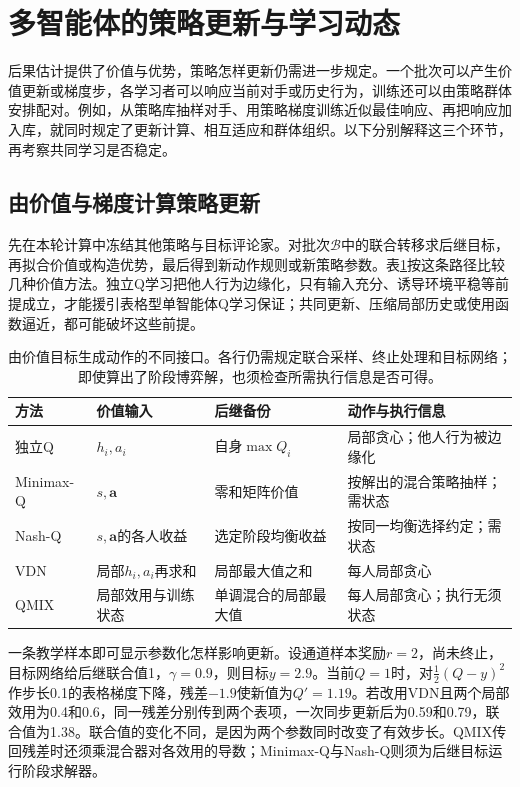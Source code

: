\section{多智能体的策略更新与学习动态}
\label{sec:rl-multi-agent-learning}

后果估计提供了价值与优势，策略怎样更新仍需进一步规定。一个批次可以产生价值更新或梯度步，各学习者可以响应当前对手或历史行为，训练还可以由策略群体安排配对。例如，从策略库抽样对手、用策略梯度训练近似最佳响应、再把响应加入库，就同时规定了更新计算、相互适应和群体组织。以下分别解释这三个环节，再考察共同学习是否稳定。

\subsection{由价值与梯度计算策略更新}
\label{sec:rl-multi-agent-update}

先在本轮计算中冻结其他策略与目标评论家。对批次$\mathcal B$中的联合转移求后继目标，再拟合价值或构造优势，最后得到新动作规则或新策略参数。表\ref{tab:rl-multi-agent-value-updates}按这条路径比较几种价值方法。独立Q学习把他人行为边缘化，只有输入充分、诱导环境平稳等前提成立，才能援引表格型单智能体Q学习保证；共同更新、压缩局部历史或使用函数逼近，都可能破坏这些前提。

\begin{table}[htbp]
 \centering
 \begin{tabularx}{\linewidth}{@{}l >{\raggedright\arraybackslash}X >{\raggedright\arraybackslash}X >{\raggedright\arraybackslash}X@{}}
 \toprule
 方法 & 价值输入 & 后继备份 & 动作与执行信息\\
 \midrule
 独立Q & $h_i,a_i$ & 自身$\max Q_i$ & 局部贪心；他人行为被边缘化\\
 Minimax-Q & $s,\bm a$ & 零和矩阵价值 & 按解出的混合策略抽样；需状态\\
 Nash-Q & $s,\bm a$的各人收益 & 选定阶段均衡收益 & 按同一均衡选择约定；需状态\\
 VDN & 局部$h_i,a_i$再求和 & 局部最大值之和 & 每人局部贪心\\
 QMIX & 局部效用与训练状态 & 单调混合的局部最大值 & 每人局部贪心；执行无须状态\\
 \bottomrule
 \end{tabularx}
 \caption{由价值目标生成动作的不同接口。各行仍需规定联合采样、终止处理和目标网络；即使算出了阶段博弈解，也须检查所需执行信息是否可得。}
 \label{tab:rl-multi-agent-value-updates}
\end{table}

一条教学样本即可显示参数化怎样影响更新。设通道样本奖励$r=2$，尚未终止，目标网络给后继联合值1，$\gamma=0.9$，则目标$y=2.9$。当前$Q=1$时，对$\tfrac12(Q-y)^2$作步长0.1的表格梯度下降，残差$-1.9$使新值为$Q'=1.19$。若改用VDN且两个局部效用为0.4和0.6，同一残差分别传到两个表项，一次同步更新后为0.59和0.79，联合值为1.38。联合值的变化不同，是因为两个参数同时改变了有效步长。QMIX传回残差时还须乘混合器对各效用的导数；Minimax-Q与Nash-Q则须为后继目标运行阶段求解器。

